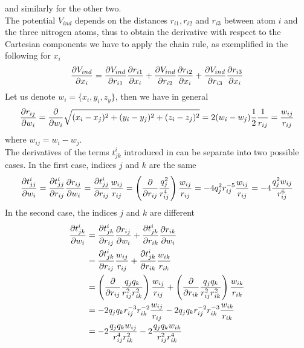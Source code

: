 \documentclass[utf8]{article}
\begin{document}
%
and similarly for the other two.\\
The potential $V_{ind}$ depends on the distances $r_{i1}, r_{i2}$ and $r_{i3}$ between
atom $i$ and the three nitrogen atoms, thus to obtain the derivative with respect to the
Cartesian components we have to apply the chain rule, as exemplified in the following for $x_i$
%
\begin{equation}\label{eq:dVdr_ind_simple}
    \frac{\partial V_{ind}}{\partial x_i} = \frac{\partial V_{ind}}{\partial r_{i1}}\frac{\partial r_{i1}}{\partial x_i} +
        \frac{\partial V_{ind}}{\partial r_{i2}}\frac{\partial r_{i2}}{\partial x_i} + \frac{\partial V_{ind}}{\partial r_{i3}}\frac{\partial r_{i3}}{\partial x_i}
\end{equation}
%
Let us denote $w_i = \{ x_i,y_i,z_y \}$, then we have in general
%
\begin{equation}
    \frac{\partial r_{ij}}{\partial w_i} = \frac{\partial }{\partial w_i} \sqrt{(x_i-x_j)^2 + (y_i-y_j)^2 + (z_i-z_j)^2}
        = 2(w_i-w_j) \frac{1}{2} \frac{1}{r_{ij}} = \frac{w_{ij}}{r_{ij}}
\end{equation}
%
where $w_{ij} = w_i - w_j$.\\
The derivatives of the terms $t^i_{jk}$ introduced in  can be
separate into two possible cases.
In the first case, indices $j$ and $k$ are the same
%
\begin{equation}
    \frac{\partial t^i_{jj}}{\partial w_i} = \frac{\partial t^i_{jj}}{\partial r_{ij}} \frac{\partial r_{ij}}{\partial w_i}
        = \frac{\partial t^i_{jj}}{\partial r_{ij}} \frac{w_{ij}}{r_{ij}}
        = \left( \frac{\partial }{\partial r_{ij}} \frac{q_j^2}{r_{ij}^4} \right) \frac{w_{ij}}{r_{ij}}
        = -4 q_j^2 r_{ij}^{-5} \frac{w_{ij}}{r_{ij}}
        = -4 \frac{q_j^2 w_{ij}}{r_{ij}^6}
\end{equation}
%
In the second case, the indices $j$ and $k$ are different
%
\begin{align}
    \frac{\partial t^i_{jk}}{\partial w_i} &= \frac{\partial t^i_{jk}}{\partial r_{ij}} \frac{\partial r_{ij}}{\partial w_i}
        + \frac{\partial t^i_{jk}}{\partial r_{ik}} \frac{\partial r_{ik}}{\partial w_i} \\
        &= \frac{\partial t^i_{jk}}{\partial r_{ij}} \frac{w_{ij}}{r_{ij}}
        + \frac{\partial t^i_{jk}}{\partial r_{ik}} \frac{w_{ik}}{r_{ik}} \\
        &= \left(\frac{\partial }{\partial r_{ij}}\frac{q_j q_k}{r_{ij}^2 r_{ik}^2}\right)\frac{w_{ij}}{r_{ij}}
        + \left(\frac{\partial }{\partial r_{ik}}\frac{q_j q_k}{r_{ij}^2 r_{ik}^2}\right)\frac{w_{ik}}{r_{ik}} \\
        &= -2 q_j q_k r_{ij}^{-3} r_{ik}^{-2} \frac{w_{ij}}{r_{ij}}
           -2 q_j q_k r_{ij}^{-2} r_{ik}^{-3} \frac{w_{ik}}{r_{ik}} \\
        &= -2 \frac{q_j q_k w_{ij}}{r_{ij}^4 r_{ik}^2}
           -2 \frac{q_j q_k w_{ik}}{r_{ij}^2 r_{ik}^4}
\end{align}
\end{document}
